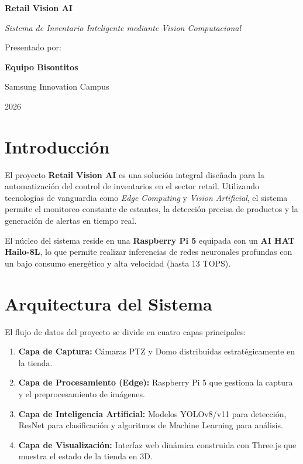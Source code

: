 \documentclass[12pt,a4paper]{article}
\begin{document}
\begin{titlepage}
    \centering
    \vspace*{1.5cm}
    {\Huge\bfseries\color{samsungblue} Retail Vision AI \par}
    \vspace{0.5cm}
    {\Large\itshape Sistema de Inventario Inteligente mediante Vision Computacional \par}
    \vspace{2cm}
    {\large Presentado por: \par}
    \vspace{0.3cm}
    {\Huge\bfseries Equipo Bisontitos \par}
    \vspace{2cm}
    \vfill
    {\large Samsung Innovation Campus \par}
    {\large 2026 \par}
\end{titlepage}

\tableofcontents
\newpage

\section{Introducción}
El proyecto \textbf{Retail Vision AI} es una solución integral diseñada para la automatización del control de inventarios en el sector retail. Utilizando tecnologías de vanguardia como \textit{Edge Computing} y \textit{Vision Artificial}, el sistema permite el monitoreo constante de estantes, la detección precisa de productos y la generación de alertas en tiempo real.

El núcleo del sistema reside en una \textbf{Raspberry Pi 5} equipada con un \textbf{AI HAT Hailo-8L}, lo que permite realizar inferencias de redes neuronales profundas con un bajo consumo energético y alta velocidad (hasta 13 TOPS).

\section{Arquitectura del Sistema}
El flujo de datos del proyecto se divide en cuatro capas principales:
\begin{enumerate}
    \item \textbf{Capa de Captura:} Cámaras PTZ y Domo distribuidas estratégicamente en la tienda.
    \item \textbf{Capa de Procesamiento (Edge):} Raspberry Pi 5 que gestiona la captura y el preprocesamiento de imágenes.
    \item \textbf{Capa de Inteligencia Artificial:} Modelos YOLOv8/v11 para detección, ResNet para clasificación y algoritmos de Machine Learning para análisis.
    \item \textbf{Capa de Visualización:} Interfaz web dinámica construida con Three.js que muestra el estado de la tienda en 3D.
\end{enumerate}
\end{document}
